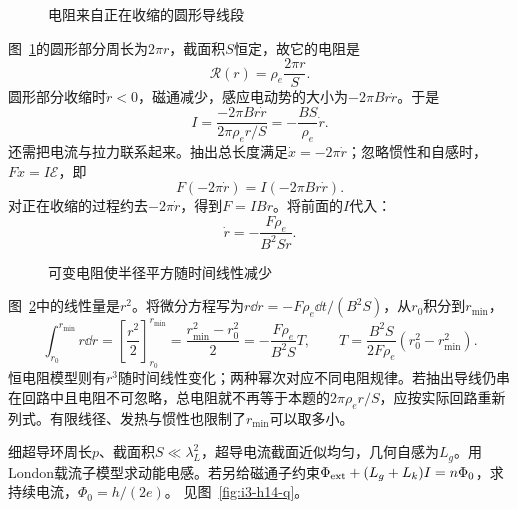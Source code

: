 \begin{figure}[H]\centering
{}
\caption{电阻来自正在收缩的圆形导线段}\label{fig:i3-h13-q}
\end{figure}
\begin{solution}
图~\ref{fig:i3-h13-q}的圆形部分周长为$2\pi r$，截面积$S$恒定，故它的电阻是
\[
\mathcal R(r)=\rho_e\frac{2\pi r}{S}.
\]
圆形部分收缩时$\dot r<0$，磁通减少，感应电动势的大小为$-2\pi Br\dot r$。于是
\[
I=\frac{-2\pi Br\dot r}{2\pi\rho_er/S}
=-\frac{BS}{\rho_e}\dot r.
\]
还需把电流与拉力联系起来。抽出总长度满足$\dot x=-2\pi\dot r$；忽略惯性和自感时，$F\dot x=I\mathcal E$，即
\[
F(-2\pi\dot r)=I(-2\pi Br\dot r).
\]
对正在收缩的过程约去$-2\pi\dot r$，得到$F=IBr$。将前面的$I$代入：
\[
\dot r=-\frac{F\rho_e}{B^2Sr}.
\]
\begin{figure}[H]\centering
{}
\caption{可变电阻使半径平方随时间线性减少}\label{fig:i3-h13-s}
\end{figure}
图~\ref{fig:i3-h13-s}中的线性量是$r^2$。将微分方程写为$r\dd r=-F\rho_e\dd t/(B^2S)$，从$r_0$积分到$r_{\min}$，
\[
\int_{r_0}^{r_{\min}}r\dd r
=\left[\frac{r^2}{2}\right]_{r_0}^{r_{\min}}
=\frac{r_{\min}^2-r_0^2}{2}
=-\frac{F\rho_e}{B^2S}T,
\qquad
\boxed{T=\frac{B^2S}{2F\rho_e}
(r_0^2-r_{\min}^2)}.
\]
恒电阻模型则有$r^3$随时间线性变化；两种幂次对应不同电阻规律。若抽出导线仍串在回路中且电阻不可忽略，总电阻就不再等于本题的$2\pi\rho_er/S$，应按实际回路重新列式。有限线径、发热与惯性也限制了$r_{\min}$可以取多小。
\end{solution}

\begin{exercise}[细超导环的动能电感（选做）]\label{ex:i3-h14}
细超导环周长$p$、截面积$S\ll\lambda_L^2$，超导电流截面近似均匀，几何自感为$L_g$。用London载流子模型求动能电感。若另给磁通子约束$\Phi_{\rm ext}+(L_g+L_k)I=n\Phi_0$，求持续电流，$\Phi_0=h/(2e)$。 见图~\ref{fig:i3-h14-q}。
\end{exercise}

